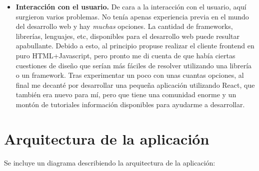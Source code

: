 \begin{itemize}
    Respecto al lenguaje de programación, partíamos de que queríamos utilizar Java para construir nuestro motor, luego no surgieron dudas\footnote{Lenguajes como Kotlin, que también se ejecutan en la JVM (Máquina Virtual de Java), representan opciones válidas para el desarrollo debido a su interoperabilidad con Java, permitiendo un uso mixto de ambos lenguajes en el mismo proyecto.}. Además, esto también esclarecía la cuestión de la plataforma, ya que en un lenguaje JVM\footnote{Java Virtual Machine}, solo tienes que programar de cara a la JVM, sin importar arquitectura o sistema operativo. Sin embargo, sí que hubo que realizar un análisis para determinar qué framework podría ayudarnos a atajar el problema de la forma más eficiente, equilibrando el rendimiento real con la dificultad de adaptarse al framework y su curva de dificultad. En este caso, se eligió Spring por encima de otros como Quarkus dado que tenía unas nociones previas en el framework y nos ofrecía un conjunto de herramientas en Spring Boot que iban a simplificar el despliegue y desarrollo de la aplicación notablemente. De cara al frontend, haremos un breve resumen en el siguiente apartado.
    \item \textbf{Interacción con el usuario.} 
    De cara a la interacción con el usuario, aquí surgieron varios problemas. No tenía apenas experiencia previa en el mundo del desarrollo web y hay \textit{muchas} opciones. La cantidad de frameworks, librerías, lenguajes, etc, disponibles para el desarrollo web puede resultar apabullante. Debido a esto, al principio propuse realizar el cliente frontend en puro HTML+Javascript, pero pronto me di cuenta de que había ciertas cuestiones de diseño que serían más fáciles de resolver utilizando una librería o un framework. Tras experimentar un poco con unas cuantas opciones, al final me decanté por desarrollar una pequeña aplicación utilizando React, que también era nuevo para mí, pero que tiene una comunidad enorme y un montón de tutoriales información disponibles para ayudarme a desarrollar. 
\end{itemize}

\section{Arquitectura de la aplicación}
Se incluye un diagrama describiendo la arquitectura de la aplicación:
\begin{landscape}
\end{landscape}
